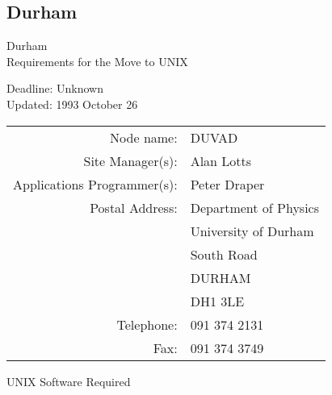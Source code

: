 \newpage
\subsection{Durham}

\renewcommand{\starsitename}{Durham}
\renewcommand{\starnodename}{DUVAD}

\renewcommand{\starunixdate}{Unknown}
\renewcommand{\starupdate}{1993 October 26}

\renewcommand{\starsitetelephone}{091 374 2131}
\renewcommand{\starsitefax}{091 374 3749}

\begin{center}
{\Large\sc \starsitename \\ [2ex]
           Requirements for the Move to UNIX}

\vspace{3mm}
{\large\sc Deadline: \starunixdate \\ [1ex]
           Updated: \starupdate}
\end{center}

\vspace{5mm}

\begin{center}
\begin{tabular}{rl}
{\sc Node name:}                  & \starnodename \\
{\sc Site Manager(s):}            & Alan Lotts \\
{\sc Applications Programmer(s):} & Peter Draper \\
{\sc Postal Address:}             & Department of Physics \\
                                  & University of Durham \\
                                  & South Road \\
                                  & DURHAM \\
                                  & DH1 3LE \\
{\sc Telephone:}                  & \starsitetelephone \\
{\sc Fax:}                        & \starsitefax \\
\end{tabular}
\end{center}

\vspace{5mm}
\begin{center}
{\large\sc UNIX Software Required}
\end{center}

